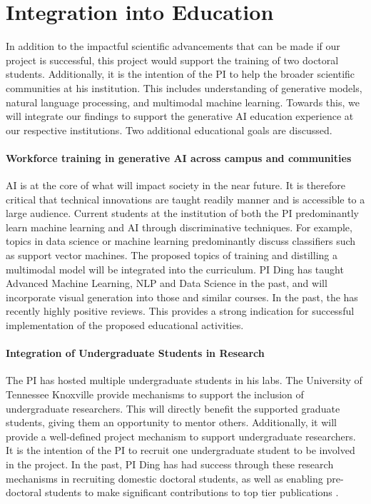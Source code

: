 \section{Integration into Education}

In addition to the impactful scientific advancements that can be made if our project is successful, this project would support the training of two doctoral students. Additionally, it is the intention of the PI to help the broader scientific communities at his institution. This includes understanding of generative models, natural language processing, and multimodal machine learning. Towards this, we will integrate our findings to support the generative AI education experience at our respective institutions. Two additional educational goals are discussed.

\paragraph{Workforce training in generative AI across campus and communities}
AI is at the core of what will impact society in the near future. It is therefore critical that technical innovations are taught readily manner and is accessible to a large audience. Current students at the institution of both the PI predominantly learn machine learning and AI through discriminative techniques. For example, topics in data science or machine learning predominantly discuss classifiers such as support vector machines. The proposed topics of training and distilling a multimodal model will be integrated into the curriculum. PI Ding has taught Advanced Machine Learning, NLP and Data Science in the past, and will incorporate visual generation into those and similar courses. In the past, the has recently highly positive reviews. This provides a strong indication for successful implementation of the proposed educational activities.

\paragraph{Integration of Undergraduate Students in Research}
The PI has hosted multiple undergraduate students in his labs. The University of Tennessee Knoxville provide mechanisms to support the inclusion of undergraduate researchers. This will directly benefit the supported graduate students, giving them an opportunity to mentor others. Additionally, it will provide a well-defined project mechanism to support undergraduate researchers. It is the intention of the PI to recruit one undergraduate student to be involved in the project. In the past, PI Ding has had success through these research mechanisms in recruiting domestic doctoral students, as well as enabling pre-doctoral students to make significant contributions to top tier publications \cite{ke2025mambev, nishi2021augmentation}.

